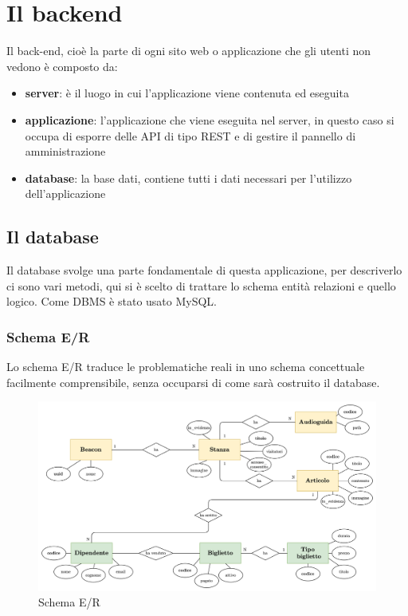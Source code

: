 \documentclass[12pt]{article}
\begin{document}

\clearpage
\section{Il backend}
Il back-end, cioè la parte di ogni sito web o applicazione che gli utenti non vedono è composto da:
\begin{itemize}
    \item \textbf{server}: è il luogo in cui l'applicazione viene contenuta ed eseguita
    \item \textbf{applicazione}: l'applicazione che viene eseguita nel server, in questo caso si occupa di esporre delle API di tipo REST e di gestire il pannello di amministrazione
    \item \textbf{database}: la base dati, contiene tutti i dati necessari per l'utilizzo dell'applicazione  
\end{itemize}

\subsection{Il database}

Il database svolge una parte fondamentale di questa applicazione, per descriverlo ci sono vari metodi, qui si è scelto di trattare lo schema entità relazioni e quello logico. Come DBMS è stato usato MySQL.

\subsubsection{Schema E/R}
Lo schema E/R traduce le problematiche reali in uno  schema concettuale facilmente comprensibile, senza occuparsi di come sarà costruito il database.

\begin{center}
    \begin{figure}[htp]
        \centering
        \includegraphics[width=14cm]{diagrams/er_scheme.png}
        \caption{Schema E/R}
        \label{fig:er}
    \end{figure}
\end{center}
\end{document}
